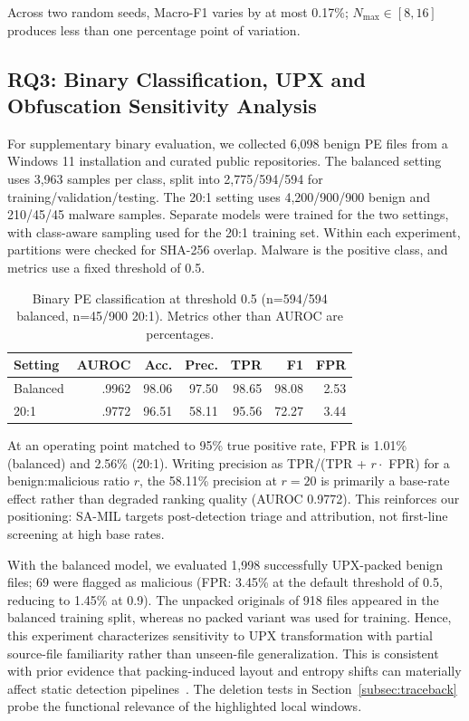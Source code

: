 \documentclass[runningheads]{llncs}
\begin{document}
Across two random seeds, Macro-F1 varies by at most 0.17\%; $N_{\max} \in [8, 16]$ produces less than one percentage point of variation.


\subsection{RQ3: Binary Classification, UPX and Obfuscation Sensitivity Analysis}
\label{subsec:binary_performance}

For supplementary binary evaluation, we collected 6,098 benign PE files from a Windows 11 installation and curated public repositories. The balanced setting uses 3,963 samples per class, split into 2,775\allowbreak/594\allowbreak/594 for training\allowbreak/validation\allowbreak/testing. The 20:1 setting uses 4,200/900/900 benign and 210/45/45 malware samples. Separate models were trained for the two settings, with class-aware sampling used for the 20:1 training set. Within each experiment, partitions were checked for SHA-256 overlap. Malware is the positive class, and metrics use a fixed threshold of 0.5.

\begin{table}[htbp]
\centering
\caption{Binary PE classification at threshold 0.5 (n=594/594 balanced, n=45/900 20:1). Metrics other than AUROC are percentages.}
\label{tab:binary}
\small
\setlength{\tabcolsep}{3.5pt}
\begin{tabular}{lrrrrrr}
\toprule
Setting & AUROC & Acc. & Prec. & TPR & F1 & FPR \\
\midrule
Balanced & .9962 & 98.06 & 97.50 & 98.65 & 98.08 & 2.53 \\
20:1     & .9772 & 96.51 & 58.11 & 95.56 & 72.27 & 3.44 \\
\bottomrule
\end{tabular}
\end{table}

At an operating point matched to 95\% true positive rate, FPR is 1.01\% (balanced) and 2.56\% (20:1). Writing precision as TPR/(TPR + $r \cdot$ FPR) for a benign:malicious ratio $r$, the 58.11\% precision at $r{=}20$ is primarily a base-rate effect rather than degraded ranking quality (AUROC 0.9772). This reinforces our positioning: SA-MIL targets post-detection triage and attribution, not first-line screening at high base rates.

With the balanced model, we evaluated 1,998 successfully UPX-packed benign files; 69 were flagged as malicious (FPR: 3.45\% at the default threshold of 0.5, reducing to 1.45\% at 0.9). The unpacked originals of 918 files appeared in the balanced training split, whereas no packed variant was used for training. Hence, this experiment characterizes sensitivity to UPX transformation with partial source-file familiarity rather than unseen-file generalization. This is consistent with prior evidence that packing-induced layout and entropy shifts can materially affect static detection pipelines~\cite{muralidharan2022file}. The deletion tests in Section~\ref{subsec:traceback} probe the functional relevance of the highlighted local windows.
\end{document}
